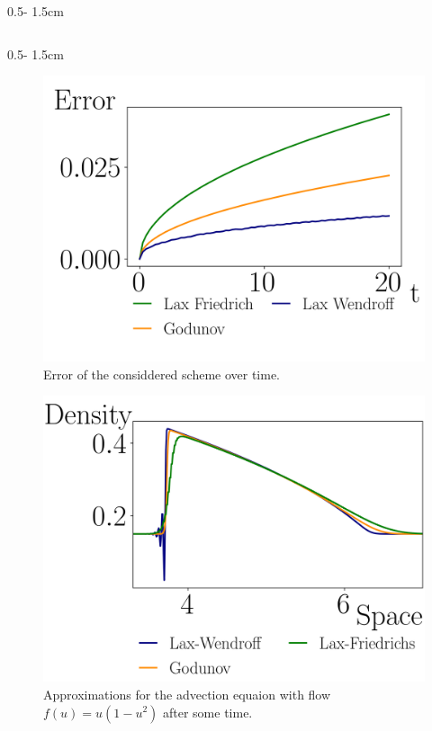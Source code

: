 \documentclass{uibposter}
\begin{document}
\begin{frame}[fragile]
\begin{columns}
\begin{column}{0.5\textwidth - 1.5cm}
\begin{column}{0.5\textwidth - 1.5cm}
    \begin{figure}
    	\includegraphics{fig/error_over_time.png}
    	\caption{Error of the considdered scheme over time.}
    	\label{img:error_over_tim}
    \end{figure}
   
	\begin{figure}
	    \includegraphics{fig/traffic_compare.png}
	    \caption{Approximations for the advection equaion with flow $f(u) = u (1 - u^2)$ after some time.}
	    \label{img:traffic_comprehension}
	\end{figure}
    

\end{column}
\end{column}
\end{columns}
\end{frame}
\end{document}
